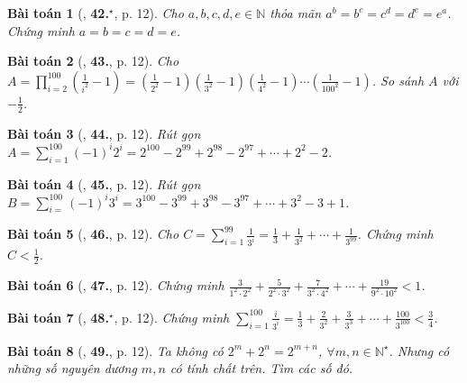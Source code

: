 \documentclass{article}
\numberwithin{equation}{section}
\newtheorem{baitoan}{Bài toán}[section]
\begin{document}
\begin{baitoan}[\cite{Binh_Toan_7_tap_1}, \textbf{42.}${}^\star$, p. 12]
	Cho $a,b,c,d,e\in\mathbb{N}$ thỏa mãn $a^b = b^c = c^d = d^e = e^a$. Chứng minh $a = b = c = d = e$.
\end{baitoan}

\begin{baitoan}[\cite{Binh_Toan_7_tap_1}, \textbf{43.}, p. 12]
	Cho $A = \prod_{i=2}^{100} \left(\frac{1}{i^2} - 1\right) = \left(\frac{1}{2^2} - 1\right)\left(\frac{1}{3^2} - 1\right)\left(\frac{1}{4^2} - 1\right)\cdots\left(\frac{1}{100^2} - 1\right)$. So sánh $A$ với $-\frac{1}{2}$.
\end{baitoan}

\begin{baitoan}[\cite{Binh_Toan_7_tap_1}, \textbf{44.}, p. 12]
	Rút gọn $A = \sum_{i=1}^{100} (-1)^i2^i = 2^{100} - 2^{99} + 2^{98} - 2^{97} + \cdots + 2^2 - 2$.
\end{baitoan}

\begin{baitoan}[\cite{Binh_Toan_7_tap_1}, \textbf{45.}, p. 12]
	Rút gọn $B = \sum_{i=
	}^{100} (-1)^i3^i = 3^{100} - 3^{99} + 3^{98} - 3^{97} + \cdots + 3^2 - 3 + 1$.
\end{baitoan}

\begin{baitoan}[\cite{Binh_Toan_7_tap_1}, \textbf{46.}, p. 12]
	Cho $C = \sum_{i=1}^{99} \frac{1}{3^i} = \frac{1}{3} + \frac{1}{3^2} + \cdots + \frac{1}{3^{99}}$. Chứng minh $C < \frac{1}{2}$.
\end{baitoan}

\begin{baitoan}[\cite{Binh_Toan_7_tap_1}, \textbf{47.}, p. 12]
	Chứng minh $\frac{3}{1^2\cdot 2^2} + \frac{5}{2^2\cdot 3^2} + \frac{7}{3^2\cdot 4^2} + \cdots + \frac{19}{9^2\cdot 10^2} < 1$.
\end{baitoan}

\begin{baitoan}[\cite{Binh_Toan_7_tap_1}, \textbf{48.}${}^\star$, p. 12]
	Chứng minh $\sum_{i=1}^{100} \frac{i}{3^i} = \frac{1}{3} + \frac{2}{3^2} + \frac{3}{3^3} + \cdots + \frac{100}{3^{100}} < \frac{3}{4}$.
\end{baitoan}

\begin{baitoan}[\cite{Binh_Toan_7_tap_1}, \textbf{49.}, p. 12]
	Ta không có $2^m + 2^n = 2^{m+n}$, $\forall m,n\in\mathbb{N}^\star$. Nhưng có những số nguyên dương $m,n$ có tính chất trên. Tìm các số đó.
\end{baitoan}
\end{document}
